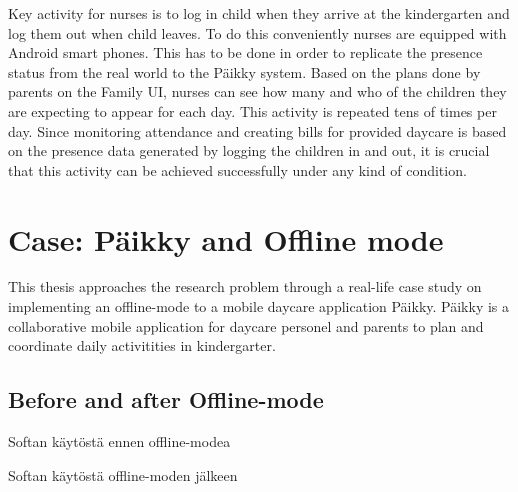 Key activity for nurses is to log in child when they arrive at the kindergarten and log them out when child leaves. To do this conveniently nurses are equipped with Android smart phones. This has to be done in order to replicate the presence status from the real world to the Päikky system. Based on the plans done by parents on the Family UI, nurses can see how many and who of the children they are expecting to appear for each day. This activity is repeated tens of times per day. Since monitoring attendance and creating bills for provided daycare is based on the presence data generated by logging the children in and out, it is crucial that this activity can be achieved successfully under any kind of condition.








\section{Case: Päikky and Offline mode}


This thesis approaches the research problem through a real-life case study on implementing an offline-mode to a mobile daycare application Päikky. Päikky is a collaborative mobile application for daycare personel and parents to plan and coordinate daily activitities in kindergarter. 




\subsection{Before and after Offline-mode}
Softan käytöstä ennen offline-modea

Softan käytöstä offline-moden jälkeen







